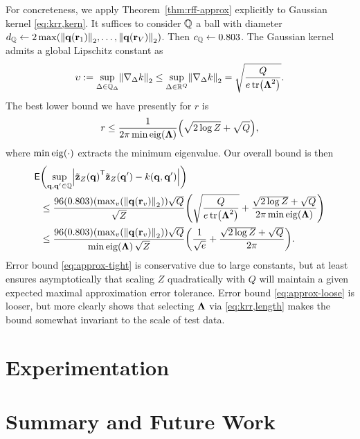 For concreteness,
we apply Theorem~\ref{thm:rff-approx} explicitly 
to Gaussian kernel \eqref{eq:krr,kern}.
It suffices to consider $\mathbb{Q}$ a ball
with diameter 
$d_\setQ \gets 2 
\max\paren{\norm{\bmq\paren{\bmr_1}}_2,\dots,\norm{\bmq\paren{\bmr_V}}_2}$.
Then $c_{\mathbb{Q}} \gets 0.803$.
The Gaussian kernel admits a global Lipschitz constant as
\begin{align}
	\upsilon := \sup_{\Delta \in \setQD} \norm{\grada{\Delta}{k}}_2 
		\leq \sup_{\Delta \in \reals{Q}} \norm{\grada{\Delta}{k}}_2 
		= \sqrt{\frac{Q}{e\trace{\bmL^2}}}.
	\label{eq:krr,lipschitz}
\end{align}
The best lower bound we have presently 
for $r$ is 
\begin{align}
	r \leq \frac{1}{2\pi \mineig{\bmL}} \paren{\sqrt{2 \log{Z}} + \sqrt{Q}},
	\label{eq:krr,max-nu}
\end{align}
where $\mineig{\cdot}$ extracts the minimum eigenvalue.
Our overall bound is then 
\begin{align}
	\mathsf{E}&\paren{\sup_{\bmq,\bmq' \in \setQ} 
		\abs{\bmztZa{\bmq}\tpose\bmztZa{\bmq'}-k\paren{\bmq,\bmq'}}} 
		\nonumber \\
	&\leq 
		\frac{96\paren{0.803}
		\paren{\max_v\paren{\norm{\bmq\paren{\bmr_v}}_2}}\sqrt{Q}}{\sqrt{Z}}
		\paren{\sqrt{\frac{Q}{e\trace{\bmL^2}}} + 
		\frac{\sqrt{2 \log{Z}} + \sqrt{Q}}{2\pi \mineig{\bmL}}}
		\label{eq:approx-tight} \\
	&\leq 
		\frac{96\paren{0.803}
		\paren{\max_v\paren{\norm{\bmq\paren{\bmr_v}}_2}}\sqrt{Q}}{\mineig{\bmL}\sqrt{Z}}
		\paren{\frac{1}{\sqrt{e}} + \frac{\sqrt{2\log{Z}} + \sqrt{Q}}{2\pi}}.
		\label{eq:approx-loose}
\end{align}	
Error bound \eqref{eq:approx-tight} is conservative 
due to large constants,
but at least ensures asymptotically
that scaling $Z$ quadratically 
with $Q$ 
will maintain a given expected maximal approximation error tolerance.
Error bound \eqref{eq:approx-loose} is looser,
but more clearly shows 
that selecting $\boldsymbol{\Lambda}$ 
via \eqref{eq:krr,length}
makes the bound somewhat invariant
to the scale of test data.

\section{Experimentation}
\label{s,krr,exp}

\section{Summary and Future Work}
\label{s,krr,summ}


